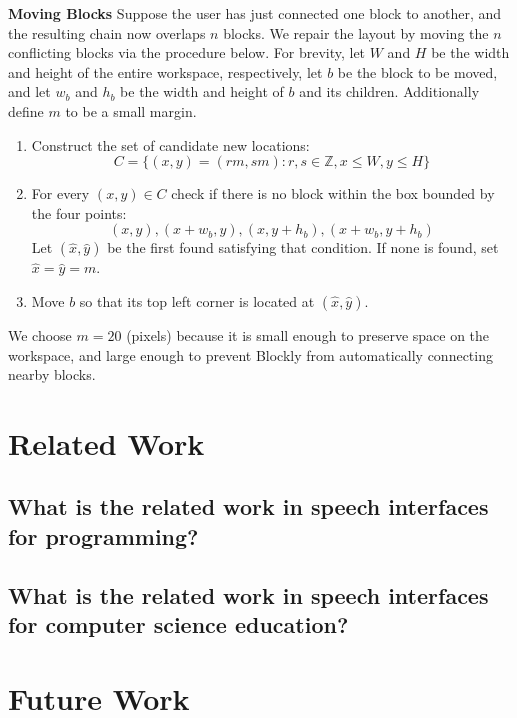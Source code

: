 \documentclass[]{article}
\begin{document}
\textbf{Moving Blocks} Suppose the user has just connected one block to another, and the
resulting chain now overlaps $n$ blocks. We repair the layout by moving the $n$ conflicting
blocks via the procedure below. For brevity, let $W$ and $H$ be the width and height of
the entire workspace, respectively, let $b$ be the block to be moved, and let
$w_b$ and $h_b$ be the width and height of $b$ and its children. Additionally define $m$
to be a small margin.
\begin{enumerate}
\item{Construct the set of candidate new locations: $$C = \{(x, y) = (rm, sm) : r, s \in \mathbb{Z}, x \le W, y \le H\}$$}
\item{For every $(x,y) \in C$ check if there is no block within the box bounded by the four points:
	$$(x,y), (x + w_b, y), (x, y + h_b), (x + w_b, y + h_b)$$
Let $(\hat{x}, \hat{y})$ be the first found satisfying that condition. If none is found, set $\hat{x} = \hat{y} = m$.
}
\item{Move $b$ so that its top left corner is located at $(\hat x, \hat y)$.}
\end{enumerate}
We choose $m = 20$ (pixels) because it is small enough to preserve space on the workspace,
and large enough to prevent Blockly from automatically connecting nearby blocks.

\section{Related Work}

\subsection{What is the related work in speech interfaces for programming?}

\subsection{What is the related work in speech interfaces for computer science education?}


\section{Future Work}
\end{document}
